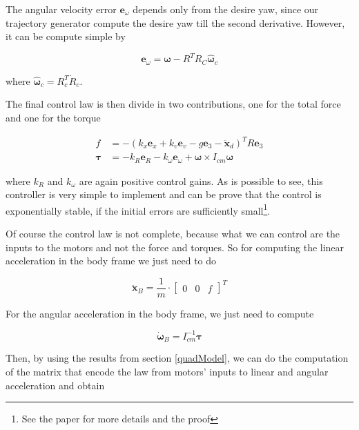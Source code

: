 \noindent The angular velocity error $\mathbf{e}_{\omega}$ depends only from the desire yaw, since our trajectory generator compute the desire yaw till the second derivative. However, it can be compute simple by 

\begin{equation}
	\mathbf{e}_{\omega} = \boldsymbol{\omega} - R^TR_C\hat{\boldsymbol{\omega}}_c
\end{equation}

\noindent where $\hat{\boldsymbol{\omega}}_c = R_c^T\dot{R}_c$.

\noindent The final control law is then divide in two contributions, one for the total force and one for the torque

\begin{align}
	f &= -(k_x\mathbf{e}_x+k_v\mathbf{e}_v-g\mathbf{e}_3-\ddot{\mathbf{x}}_d)^TR\mathbf{e}_3 \label{eq:LeeController1} \\
	\boldsymbol{\tau} &= -k_R\mathbf{e}_R - k_{\omega}\boldsymbol{e}_{\omega} + \boldsymbol{\omega}\times I_{cm}\boldsymbol{\omega} \label{eq:LeeController2} 
\end{align}

\noindent where $k_R$ and $k_{\omega}$ are again positive control gains. As is possible to see, this controller is very simple to implement and can be prove that the control is exponentially stable, if the initial errors are sufficiently small\footnote{See the paper \cite{LeeController} for more details and the proof}. 

\noindent Of course the control law is not complete, because what we can control are the inputs to the motors and not the force and torques. So for computing the linear acceleration in the body frame we just need to do 

\begin{equation}
	\ddot{\mathbf{x}}_B = \frac{1}{m}\cdot\begin{bmatrix}0 & 0 & f\end{bmatrix}^T
\end{equation}

\noindent For the angular acceleration in the body frame, we just need to compute

\begin{equation}
	\dot{\boldsymbol{\omega}}_B = I_{cm}^{-1}\boldsymbol{\tau}
\end{equation}

\noindent Then, by using the results from section \ref{quadModel}, we can do the computation of the matrix that encode the law from motors' inputs to linear and angular acceleration and obtain

